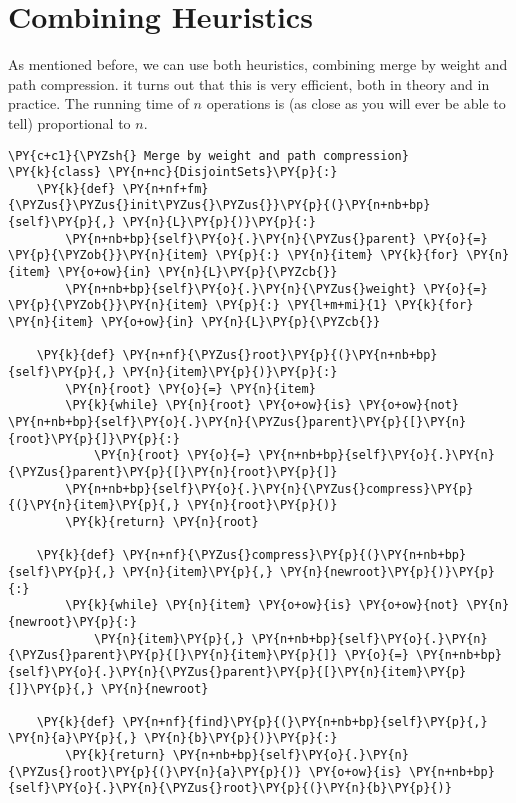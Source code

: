 \chapter{Combining Heuristics}


As mentioned before, we can use both heuristics, combining merge by weight and path compression.  it turns out that this is very efficient, both in theory and in practice.  The running time of $n$ operations is (as close as you will ever be able to tell) proportional to $n$.

\begin{Verbatim}[commandchars=\\\{\}]
\PY{c+c1}{\PYZsh{} Merge by weight and path compression}
\PY{k}{class} \PY{n+nc}{DisjointSets}\PY{p}{:}
    \PY{k}{def} \PY{n+nf+fm}{\PYZus{}\PYZus{}init\PYZus{}\PYZus{}}\PY{p}{(}\PY{n+nb+bp}{self}\PY{p}{,} \PY{n}{L}\PY{p}{)}\PY{p}{:}
        \PY{n+nb+bp}{self}\PY{o}{.}\PY{n}{\PYZus{}parent} \PY{o}{=} \PY{p}{\PYZob{}}\PY{n}{item} \PY{p}{:} \PY{n}{item} \PY{k}{for} \PY{n}{item} \PY{o+ow}{in} \PY{n}{L}\PY{p}{\PYZcb{}}
        \PY{n+nb+bp}{self}\PY{o}{.}\PY{n}{\PYZus{}weight} \PY{o}{=} \PY{p}{\PYZob{}}\PY{n}{item} \PY{p}{:} \PY{l+m+mi}{1} \PY{k}{for} \PY{n}{item} \PY{o+ow}{in} \PY{n}{L}\PY{p}{\PYZcb{}}

    \PY{k}{def} \PY{n+nf}{\PYZus{}root}\PY{p}{(}\PY{n+nb+bp}{self}\PY{p}{,} \PY{n}{item}\PY{p}{)}\PY{p}{:}
        \PY{n}{root} \PY{o}{=} \PY{n}{item}
        \PY{k}{while} \PY{n}{root} \PY{o+ow}{is} \PY{o+ow}{not} \PY{n+nb+bp}{self}\PY{o}{.}\PY{n}{\PYZus{}parent}\PY{p}{[}\PY{n}{root}\PY{p}{]}\PY{p}{:}
            \PY{n}{root} \PY{o}{=} \PY{n+nb+bp}{self}\PY{o}{.}\PY{n}{\PYZus{}parent}\PY{p}{[}\PY{n}{root}\PY{p}{]}
        \PY{n+nb+bp}{self}\PY{o}{.}\PY{n}{\PYZus{}compress}\PY{p}{(}\PY{n}{item}\PY{p}{,} \PY{n}{root}\PY{p}{)}
        \PY{k}{return} \PY{n}{root}

    \PY{k}{def} \PY{n+nf}{\PYZus{}compress}\PY{p}{(}\PY{n+nb+bp}{self}\PY{p}{,} \PY{n}{item}\PY{p}{,} \PY{n}{newroot}\PY{p}{)}\PY{p}{:}
        \PY{k}{while} \PY{n}{item} \PY{o+ow}{is} \PY{o+ow}{not} \PY{n}{newroot}\PY{p}{:}
            \PY{n}{item}\PY{p}{,} \PY{n+nb+bp}{self}\PY{o}{.}\PY{n}{\PYZus{}parent}\PY{p}{[}\PY{n}{item}\PY{p}{]} \PY{o}{=} \PY{n+nb+bp}{self}\PY{o}{.}\PY{n}{\PYZus{}parent}\PY{p}{[}\PY{n}{item}\PY{p}{]}\PY{p}{,} \PY{n}{newroot}

    \PY{k}{def} \PY{n+nf}{find}\PY{p}{(}\PY{n+nb+bp}{self}\PY{p}{,} \PY{n}{a}\PY{p}{,} \PY{n}{b}\PY{p}{)}\PY{p}{:}
        \PY{k}{return} \PY{n+nb+bp}{self}\PY{o}{.}\PY{n}{\PYZus{}root}\PY{p}{(}\PY{n}{a}\PY{p}{)} \PY{o+ow}{is} \PY{n+nb+bp}{self}\PY{o}{.}\PY{n}{\PYZus{}root}\PY{p}{(}\PY{n}{b}\PY{p}{)}


\end{Verbatim}
